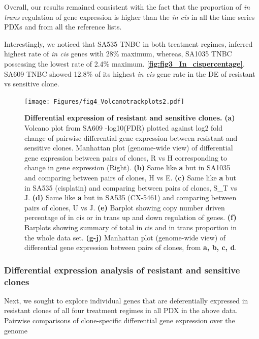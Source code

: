 Overall, our results remained consistent with the fact that the proportion of \textit{in trans} regulation of gene expression is higher than the \textit{in cis} in all the time series PDXs and from all the reference lists.   
 
 Interestingly, we noticed that SA535 TNBC in both treatment regimes, inferred highest rate of \textit{in cis} genes with 28\% maximum, whereas, SA1035 TNBC possessing the lowest rate of 2.4\% maximum. 
\textbf{\autoref{fig:fig3_In_cispercentage}}. SA609 TNBC showed 12.8\% of its highest \textit{in cis} gene rate in the DE of resistant vs sensitive clone.


\begin{figure}
\centering
  \texttt{[image: Figures/fig4\_Volcanotrackplots2.pdf]}
\caption[DE of resistant and sensitive clonealign defined clones]
	{\small
	\textbf{Differential expression of resistant and sensitive clones.}
	\textbf{(a)} Volcano plot from SA609 -log10(FDR) plotted against log2 fold change of pairwise differential gene expression between resistant and sensitive clones. Manhattan plot (genome-wide view) of differential gene expression between pairs of clones, R vs H corresponding to change in gene expression (Right).
	    \textbf{(b)} Same like \textbf{a} but in SA1035 and comparing between pairs of clones, H vs E. 
	     \textbf{(c)} Same like \textbf{a} but in SA535 (cisplatin) and comparing between pairs of clones, S\_T vs J. 
	     \textbf{(d)} Same like \textbf{a} but in SA535 (CX-5461) and comparing between pairs of clones, U vs J.
	   \textbf{(e)} Barplot showing copy number driven percentage of in cis or in trans up and down regulation of genes.
	   \textbf{(f)} Barplots showing summary of total in cis and in trans proportion in the whole data set.
	     \textbf{(g-j)} Manhattan plot (genome-wide view) of differential gene expression between pairs of clones, from \textbf{a, b, c, d}. }
	\label{fig:fig4_Volcanotrackplots2}
\end{figure}

\subsubsection{Differential expression analysis of resistant and sensitive clones}
Next, we sought to explore individual genes that are deferentially expressed in resistant clones of all four treatment regimes in all PDX in the above data.
Pairwise comparisons of clone-specific differential gene expression over the genome




